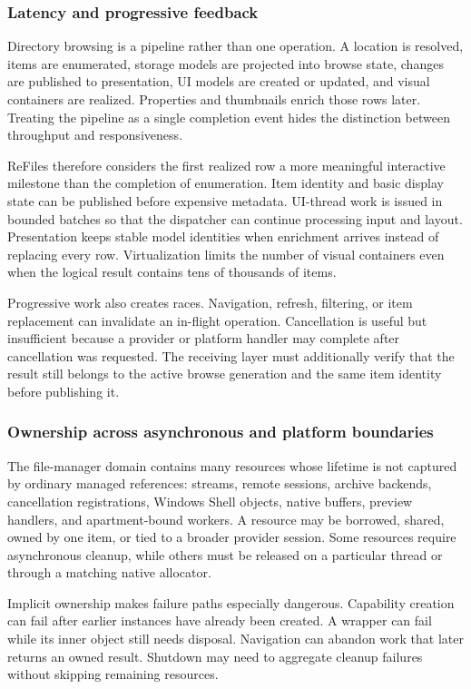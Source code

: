\documentclass[10pt,a4paper,twoside]{article}
\begin{document}
\subsubsection{Latency and progressive feedback}

Directory browsing is a pipeline rather than one operation. A location is resolved, items are enumerated,
storage models are projected into browse state, changes are published to presentation, UI models are created or
updated, and visual containers are realized. Properties and thumbnails enrich those rows later. Treating the
pipeline as a single completion event hides the distinction between throughput and responsiveness.

ReFiles therefore considers the first realized row a more meaningful interactive milestone than the completion
of enumeration. Item identity and basic display state can be published before expensive metadata. UI-thread work
is issued in bounded batches so that the dispatcher can continue processing input and layout. Presentation keeps
stable model identities when enrichment arrives instead of replacing every row. Virtualization limits the number
of visual containers even when the logical result contains tens of thousands of items.

Progressive work also creates races. Navigation, refresh, filtering, or item replacement can invalidate an
in-flight operation. Cancellation is useful but insufficient because a provider or platform handler may complete
after cancellation was requested. The receiving layer must additionally verify that the result still belongs to
the active browse generation and the same item identity before publishing it.

\subsubsection{Ownership across asynchronous and platform boundaries}

The file-manager domain contains many resources whose lifetime is not captured by ordinary managed references:
streams, remote sessions, archive backends, cancellation registrations, Windows Shell objects, native buffers,
preview handlers, and apartment-bound workers. A resource may be borrowed, shared, owned by one item, or tied to
a broader provider session. Some resources require asynchronous cleanup, while others must be released on a
particular thread or through a matching native allocator.

Implicit ownership makes failure paths especially dangerous. Capability creation can fail after earlier
instances have already been created. A wrapper can fail while its inner object still needs disposal. Navigation
can abandon work that later returns an owned result. Shutdown may need to aggregate cleanup failures without
skipping remaining resources.
\end{document}
